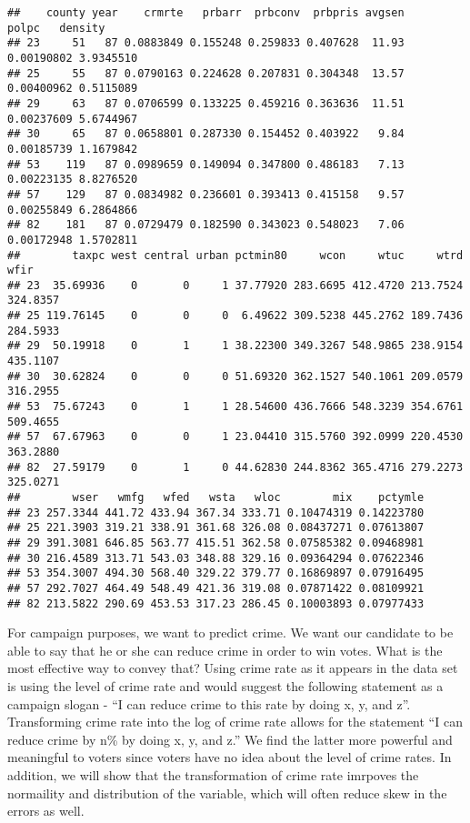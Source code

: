 \documentclass[
]{article}
\begin{document}
\begin{verbatim}
##    county year    crmrte   prbarr  prbconv  prbpris avgsen      polpc   density
## 23     51   87 0.0883849 0.155248 0.259833 0.407628  11.93 0.00190802 3.9345510
## 25     55   87 0.0790163 0.224628 0.207831 0.304348  13.57 0.00400962 0.5115089
## 29     63   87 0.0706599 0.133225 0.459216 0.363636  11.51 0.00237609 5.6744967
## 30     65   87 0.0658801 0.287330 0.154452 0.403922   9.84 0.00185739 1.1679842
## 53    119   87 0.0989659 0.149094 0.347800 0.486183   7.13 0.00223135 8.8276520
## 57    129   87 0.0834982 0.236601 0.393413 0.415158   9.57 0.00255849 6.2864866
## 82    181   87 0.0729479 0.182590 0.343023 0.548023   7.06 0.00172948 1.5702811
##        taxpc west central urban pctmin80     wcon     wtuc     wtrd     wfir
## 23  35.69936    0       0     1 37.77920 283.6695 412.4720 213.7524 324.8357
## 25 119.76145    0       0     0  6.49622 309.5238 445.2762 189.7436 284.5933
## 29  50.19918    0       1     1 38.22300 349.3267 548.9865 238.9154 435.1107
## 30  30.62824    0       0     0 51.69320 362.1527 540.1061 209.0579 316.2955
## 53  75.67243    0       1     1 28.54600 436.7666 548.3239 354.6761 509.4655
## 57  67.67963    0       0     1 23.04410 315.5760 392.0999 220.4530 363.2880
## 82  27.59179    0       1     0 44.62830 244.8362 365.4716 279.2273 325.0271
##        wser   wmfg   wfed   wsta   wloc        mix    pctymle
## 23 257.3344 441.72 433.94 367.34 333.71 0.10474319 0.14223780
## 25 221.3903 319.21 338.91 361.68 326.08 0.08437271 0.07613807
## 29 391.3081 646.85 563.77 415.51 362.58 0.07585382 0.09468981
## 30 216.4589 313.71 543.03 348.88 329.16 0.09364294 0.07622346
## 53 354.3007 494.30 568.40 329.22 379.77 0.16869897 0.07916495
## 57 292.7027 464.49 548.49 421.36 319.08 0.07871422 0.08109921
## 82 213.5822 290.69 453.53 317.23 286.45 0.10003893 0.07977433
\end{verbatim}

For campaign purposes, we want to predict crime. We want our candidate
to be able to say that he or she can reduce crime in order to win votes.
What is the most effective way to convey that? Using crime rate as it
appears in the data set is using the level of crime rate and would
suggest the following statement as a campaign slogan - ``I can reduce
crime to this rate by doing x, y, and z''. Transforming crime rate into
the log of crime rate allows for the statement ``I can reduce crime by
n\% by doing x, y, and z.'' We find the latter more powerful and
meaningful to voters since voters have no idea about the level of crime
rates. In addition, we will show that the transformation of crime rate
imrpoves the normaility and distribution of the variable, which will
often reduce skew in the errors as well.\\
\end{document}
